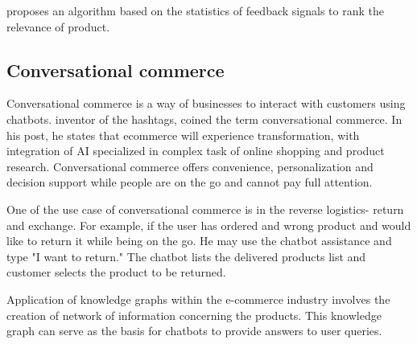 \parencite{KarmakerSantu.2017} proposes an algorithm based on the statistics of feedback signals to rank the relevance of product. 


\subsection*{Conversational commerce}

 Conversational commerce is a way of businesses to interact with customers using chatbots. \parencite{ChrisMessina} inventor of the hashtags, coined the term conversational commerce. In his post, he states that ecommerce will experience transformation, with integration of \acf{AI} specialized in complex task of online shopping and product research.  Conversational commerce offers convenience, personalization and decision support while people are on the go and cannot pay full attention.  
 
 One of the use case of conversational commerce is in the reverse logistics- return and exchange. For example, if the user has ordered and wrong product and would like to return it while being on the go. He may use the chatbot assistance and type "I want to return." The chatbot lists the delivered products list and customer selects the product to be returned. 

Application of knowledge graphs within the e-commerce industry involves the creation of network of information concerning the products. This knowledge graph can serve as the basis for chatbots to provide answers to user queries. 